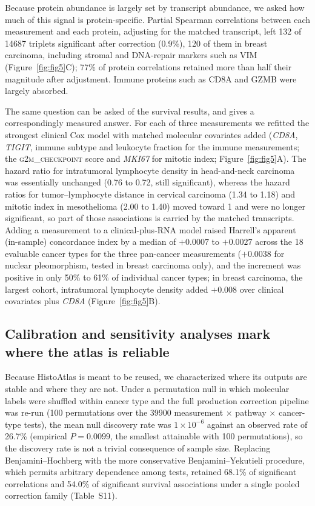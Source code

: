 Because protein abundance is largely set by transcript abundance, we asked how
much of this signal is protein-specific. Partial Spearman correlations between
each measurement and each protein, adjusting for the matched transcript, left
132 of \num{14687} triplets significant after correction (0.9\%), 120 of them in
breast carcinoma, including stromal and DNA-repair markers such as VIM
(Figure~\ref{fig:fig5}C); 77\% of protein correlations retained more than half
their magnitude after adjustment. Immune proteins such as CD8A and GZMB were
largely absorbed.

The same question can be asked of the survival results, and gives a
correspondingly measured answer. For each of three measurements we refitted the
strongest clinical Cox model with matched molecular covariates added
(\textit{CD8A}, \textit{TIGIT}, immune subtype and leukocyte fraction for the
immune measurements; the \textsc{g2m\_checkpoint} score and \textit{MKI67} for
mitotic index; Figure~\ref{fig:fig5}A). The hazard ratio for intratumoral
lymphocyte density in head-and-neck carcinoma was essentially unchanged (0.76 to
0.72, still significant), whereas the hazard ratios for tumor--lymphocyte
distance in cervical carcinoma (1.34 to 1.18) and mitotic index in mesothelioma
(2.00 to 1.40) moved toward 1 and were no longer significant, so part of those
associations is carried by the matched transcripts. Adding a measurement to a clinical-plus-RNA model raised Harrell's
apparent (in-sample) concordance index by a median of $+0.0007$ to $+0.0027$ across the 18 evaluable
cancer types for the three pan-cancer measurements ($+0.0038$ for nuclear
pleomorphism, tested in breast carcinoma only), and the increment was positive in
only 50\% to 61\% of individual cancer types; in
breast carcinoma, the largest cohort, intratumoral lymphocyte density added
$+0.008$ over clinical covariates plus \textit{CD8A} (Figure~\ref{fig:fig5}B).

\subsection{Calibration and sensitivity analyses mark where the atlas is reliable}
\label{sec:results:calibration}

Because HistoAtlas is meant to be reused, we characterized where its outputs are
stable and where they are not. Under a permutation null in which molecular
labels were shuffled within cancer type and the full production correction
pipeline was re-run (100 permutations over the \num{39900} measurement $\times$
pathway $\times$ cancer-type tests), the mean null discovery rate was
$1 \times 10^{-6}$ against an observed rate of 26.7\%
(empirical $P = 0.0099$, the smallest attainable with 100 permutations), so the
discovery rate is not a trivial consequence of sample size. Replacing
Benjamini--Hochberg with the more conservative Benjamini--Yekutieli procedure,
which permits arbitrary dependence among tests, retained 68.1\% of significant
correlations and 54.0\% of significant survival associations under a single
pooled correction family (Table~S11).

